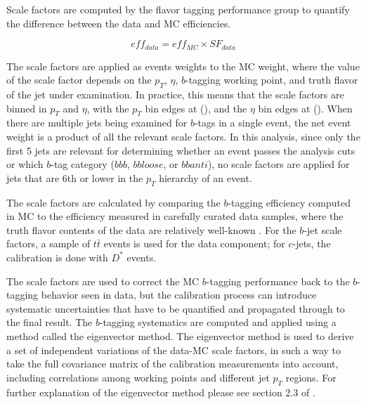 Scale factors are computed by the flavor tagging performance group to quantify the
difference between the data and MC efficiencies.

    \begin{equation}
        eff_{data}=eff_{MC}\times SF_{data}
    \end{equation}


The scale factors are applied as events weights to the MC weight, where the value
of the scale factor depends on the $p_T$, $\eta$, $b$-tagging working point, 
 and truth flavor of the jet under
examination.  In practice, this means that the scale factors are binned in $p_T$
and $\eta$, with the $p_T$ bin edges at (), and the $\eta$ bin edges at ().
When there are multiple jets being examined for $b$-tags in a single
event, the net event weight is a product of all the relevant scale factors.
In this analysis, since only the first 5 jets are relevant for determining 
whether an event passes the analysis cuts or which $b$-tag category ($bbb$, 
$bbloose$, or $bbanti$), no scale factors are applied for jets that are 6th
or lower in the $p_T$ hierarchy of an event.

The scale factors are calculated by comparing the $b$-tagging efficiency computed 
in MC to the efficiency measured in carefully curated data samples, where the truth
flavor contents of the data are relatively well-known \cite{b-tagging}.  For the $b$-jet
scale factors, a sample of $t\bar{t}$ events is used for the data component; for 
$c$-jets, the calibration is done with $D^*$ events.

The scale factors are used to correct the MC $b$-tagging performance back to the $b$-tagging
behavior seen in data, but the calibration process can introduce systematic uncertainties
that have to be quantified and propagated through to the final result.  The $b$-tagging
systematics are computed and applied using a method called the eigenvector method.
The eigenvector method is used to derive a set of independent variations of the data-MC scale
factors, in such a way to take the full covariance matrix of the calibration measurements
into account, including correlations among working points and different jet $p_{T}$ regions.
For further explanation of the eigenvector method please see section 2.3 of \cite{VHBTagging}. 


